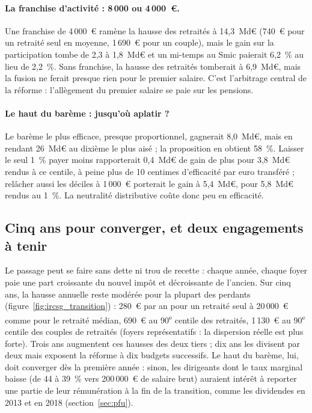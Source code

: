 \paragraph{La franchise d'activité : 8\,000 ou 4\,000~€.} Une franchise de 4\,000~€ ramène la hausse des retraités à
14,3~Md€ (740~€ pour un retraité seul en moyenne, 1\,690~€ pour un couple), mais le gain sur la participation tombe de
2,3 à 1,8~Md€ et un mi-temps au Smic paierait 6,2~\% au lieu de 2,2~\%. Sans franchise, la hausse des retraités
tomberait à 6,9~Md€, mais la fusion ne ferait presque rien pour le premier salaire. C'est l'arbitrage central de la
réforme : l'allègement du premier salaire se paie sur les pensions.

\paragraph{Le haut du barème : jusqu'où aplatir ?} Le barème le plus efficace, presque proportionnel, gagnerait 8,0~Md€,
mais en rendant 26~Md€ au dixième le plus aisé ; la proposition en obtient 58~\%. Laisser le seul 1~\% payer moins
rapporterait 0,4~Md€ de gain de plus pour 3,8~Md€ rendus à ce centile, à peine plus de 10 centimes d'efficacité par euro
transféré ; relâcher aussi les déciles à 1\,000~€ porterait le gain à 5,4~Md€, pour 5,8~Md€ rendus au 1~\%. La
neutralité distributive coûte donc peu en efficacité.

\subsection{Cinq ans pour converger, et deux engagements à tenir}

Le passage peut se faire sans dette ni trou de recette : chaque année, chaque foyer paie une part croissante du nouvel
impôt et décroissante de l'ancien. Sur cinq ans, la hausse annuelle reste modérée pour la plupart des perdants
(figure~\ref{fig:ircsg_transition}) : 280~€ par an pour un retraité seul à 20\,000~€ comme pour le retraité médian,
690~€ au 90\textsuperscript{e} centile des retraités, 1\,130~€ au 90\textsuperscript{e} centile des couples de retraités
(foyers représentatifs : la dispersion réelle est plus forte). Trois ans augmentent ces hausses des deux tiers ; dix ans
les divisent par deux mais exposent la réforme à dix budgets successifs. Le haut du barème, lui, doit converger dès la
première année : sinon, les dirigeants dont le taux marginal baisse (de 44 à 39~\% vers 200\,000~€ de salaire brut)
auraient intérêt à reporter une partie de leur rémunération à la fin de la transition, comme les dividendes en 2013 et
en 2018 (section~\ref{sec:pfu}).

